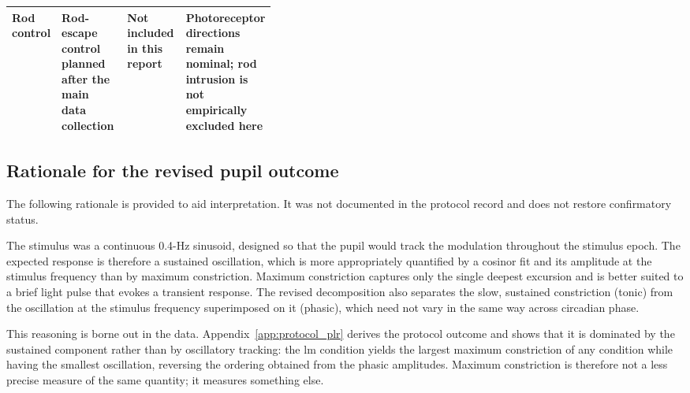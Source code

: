 \begin{appendixbox}
\begin{center}
\begin{tabularx}{\linewidth}{@{}>{\raggedright\arraybackslash}p{0.17\linewidth}>{\raggedright\arraybackslash}X>{\raggedright\arraybackslash}X>{\raggedright\arraybackslash}p{0.22\linewidth}@{}}
\addlinespace
Rod control & Rod-escape control planned after the main data collection & Not included in this report & Photoreceptor directions remain nominal; rod intrusion is not empirically excluded here \\
\bottomrule
\end{tabularx}
\end{center}
\internallinenumbers

\subsection{Rationale for the revised pupil outcome}

The following rationale is provided to aid interpretation. It was not documented in the protocol record and does not restore confirmatory status.

The stimulus was a continuous 0.4-Hz sinusoid, designed so that the pupil would track the modulation throughout the stimulus epoch. The expected response is therefore a sustained oscillation, which is more appropriately quantified by a cosinor fit and its amplitude at the stimulus frequency than by maximum constriction. Maximum constriction captures only the single deepest excursion and is better suited to a brief light pulse that evokes a transient response. The revised decomposition also separates the slow, sustained constriction (tonic) from the oscillation at the stimulus frequency superimposed on it (phasic), which need not vary in the same way across circadian phase.

This reasoning is borne out in the data. Appendix~\ref{app:protocol_plr} derives the protocol outcome and shows that it is dominated by the sustained component rather than by oscillatory tracking: the \acs{lm} condition yields the largest maximum constriction of any condition while having the smallest oscillation, reversing the ordering obtained from the phasic amplitudes. Maximum constriction is therefore not a less precise measure of the same quantity; it measures something else.


\end{appendixbox}

